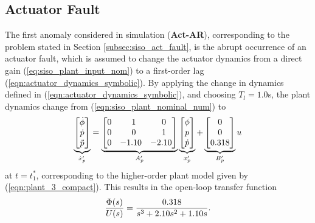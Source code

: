 \subsection{Actuator Fault}\label{subsec:siso_act_sims}
The first anomaly considered in simulation (\textbf{Act-AR}), corresponding to the problem stated in Section \ref{subsec:siso_act_fault}, is the abrupt occurrence of an actuator fault, which is assumed to change the actuator dynamics from a direct gain (\ref{eq:siso_plant_input_nom}) to a first-order lag (\ref{eqn:actuator_dynamics_symbolic}). By applying the change in dynamics defined in (\ref{eqn:actuator_dynamics_symbolic}), and choosing $T_l = 1.0$s, the plant dynamics change from (\ref{eqn:siso_plant_nominal_num}) to
\begin{equation}
	\underbrace{\begin{bmatrix}
			\dot{\phi} \\ \dot{p} \\ \ddot{p}
		\end{bmatrix}}_{\dot{x}_p'} = \underbrace{\begin{bmatrix}
		0 & \hfil 1 & \hfil 0\\ 0 & \hfil 0 & \hfil 1 \\ 0 & -1.10 & -2.10
	\end{bmatrix}}_{A_p'} \underbrace{\begin{bmatrix}
			\phi \\ p \\ \dot{p}
		\end{bmatrix}}_{x_p'} + \underbrace{\begin{bmatrix}
		0 \\ 0 \\ 0.318
	\end{bmatrix}}_{B_p'} u
	\label{eqn:plant_3}
\end{equation}
\noindent at $t = t_1^*$, corresponding to the higher-order plant model given by (\ref{eqn:plant_3_compact}). This results in the open-loop transfer function
\begin{equation}
		\frac{\Phi(s)}{U(s)} = \frac{0.318}{s^3 + 2.10s^2 + 1.10s}.\\
\end{equation}

